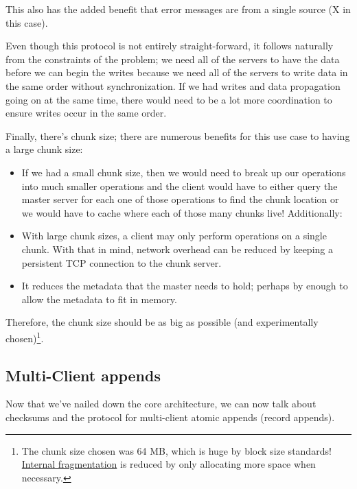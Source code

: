 \documentclass[11pt]{article}
\begin{document}
This also has the added benefit that error messages are from a single source (X in this case).

Even though this protocol is not entirely straight-forward, it follows naturally from the constraints of the problem; we need all of the servers to have the data before
we can begin the writes because we need all of the servers to write data in the same order without synchronization. If we had writes and data propagation going on at the same time,
there would need to be a lot more coordination to ensure writes occur in the same order.

Finally, there's chunk size; there are numerous benefits for this use case to having a large chunk size:
\begin{itemize}
\item If we had a small chunk size, then we would need to break up our operations into much smaller operations and the client would have to either
query the master server for each one of those operations to find the chunk location or we would have to cache where each of those many chunks live! Additionally:
\item With large chunk sizes, a client may only perform operations on a single chunk. With that in mind, network overhead can be reduced by keeping a persistent TCP connection to the chunk server.
\item It reduces the metadata that the master needs to hold; perhaps by enough to allow the metadata to fit in memory.
\end{itemize}
Therefore, the chunk size should be as big as possible (and experimentally chosen)\footnote{The chunk size chosen was 64 MB, which is huge by block size standards\footnotemark! \href{https://stackoverflow.com/questions/1200694/internal-and-external-fragmentation}{Internal fragmentation} is reduced by only allocating more space when necessary.}.

\subsection*{Multi-Client appends}
\label{sec:org9011b39}
Now that we've nailed down the core architecture, we can now talk about checksums and the protocol for multi-client atomic appends (record appends).
\end{document}
